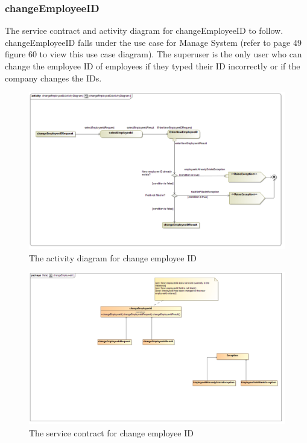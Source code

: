 \documentclass[a4paper,12pt]{report}
\begin{document}
\subsubsection{changeEmployeeID}
The service contract and activity diagram for changeEmployeeID to follow. changeEmployeeID falls under the use case for Manage System (refer to page 49 figure 60 to view this use case diagram). The superuser is the only user who can change the employee ID of employees if they typed their ID incorrectly or if the company changes the IDs.
\begin{figure}[H]
  \centering
    \includegraphics[width=1.0\textwidth]{../images/changeEmployeeIDActivityDiagram.png}
    \caption{The activity diagram for change employee ID} 
\end{figure}

\begin{figure}[H]
	\centering
	\includegraphics[width=1.0\textwidth]{../images/changeEmployeeIdSC.png}
	\caption{The service contract for change employee ID}
\end{figure}
\end{document}
